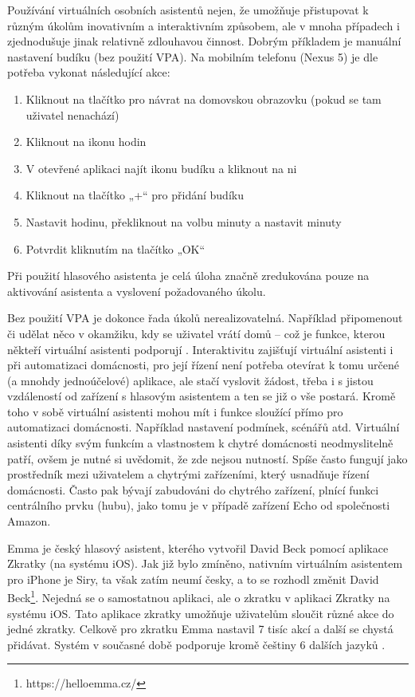 Používání virtuálních osobních asistentů nejen, že umožňuje přistupovat k různým úkolům inovativním a interaktivním způsobem, ale v mnoha případech i zjednodušuje jinak relativně zdlouhavou činnost. Dobrým příkladem je manuální nastavení budíku (bez použití VPA). Na mobilním telefonu (Nexus 5) je dle \cite{TalkingToSmartDevices} potřeba vykonat následující akce:
\begin{enumerate}
\item Kliknout na tlačítko pro návrat na domovskou obrazovku (pokud se tam uživatel nenachází)
\item Kliknout na ikonu hodin
\item V otevřené aplikaci najít ikonu budíku a kliknout na ni 
\item Kliknout na tlačítko „+“ pro přidání budíku
\item Nastavit hodinu, překliknout na volbu minuty a nastavit minuty
\item Potvrdit kliknutím na tlačítko „OK“
\end{enumerate}
Při použití hlasového asistenta je celá úloha značně zredukována pouze na aktivování asistenta a vyslovení požadovaného úkolu.

Bez použití VPA je dokonce řada úkolů nerealizovatelná. Například připomenout či udělat něco v okamžiku, kdy se uživatel vrátí domů -- což je funkce, kterou někteří virtuální asistenti podporují \cite{CoJeSmartHomeHub}. Interaktivitu zajišťují virtuální asistenti i při automatizaci domácnosti, pro její řízení není potřeba otevírat k tomu určené (a mnohdy jednoúčelové) aplikace, ale stačí vyslovit žádost, třeba i s jistou vzdáleností od zařízení s hlasovým asistentem a ten se již o vše postará. Kromě toho v sobě virtuální asistenti mohou mít i funkce sloužící přímo pro automatizaci domácnosti. Například nastavení podmínek, scénářů atd.
Virtuální asistenti díky svým funkcím a vlastnostem k chytré domácnosti neodmyslitelně patří, ovšem je nutné si uvědomit, že zde nejsou nutností. Spíše často fungují jako prostředník mezi uživatelem a chytrými zařízeními, který usnadňuje řízení domácnosti. Často pak bývají zabudováni do chytrého zařízení, plnící funkci centrálního prvku (hubu), jako tomu je v případě zařízení Echo od společnosti Amazon. 

Emma je český hlasový asistent, kterého vytvořil David Beck pomocí aplikace Zkratky (na systému iOS). Jak již bylo zmíněno, nativním virtuálním asistentem pro iPhone je Siry, ta však zatím neumí česky, a to se rozhodl změnit David Beck\footnote{https://helloemma.cz/}. Nejedná se o samostatnou aplikaci, ale o zkratku v aplikaci Zkratky na systému iOS. Tato aplikace zkratky umožňuje uživatelům sloučit různé akce do jedné zkratky. Celkově pro zkratku Emma nastavil 7 tisíc akcí a další se chystá přidávat. Systém v současné době podporuje kromě češtiny 6 dalších jazyků \cite{HelloEmmaManual}.

